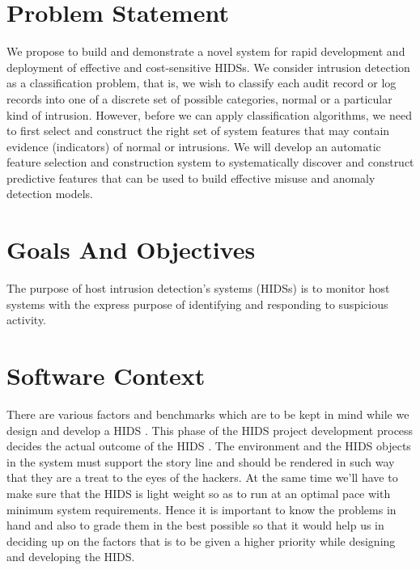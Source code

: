 \documentclass[12pt,a4paper]{report}
\begin{document}
\section{Problem Statement}
We propose to build and demonstrate a novel system for rapid development and deployment of effective and cost-sensitive HIDSs. We consider intrusion detection as a classification problem, that is, we wish to classify each audit record or log records into one of a discrete set of possible categories, normal or a particular kind of intrusion. However, before we can apply classification algorithms, we need to first select and construct the right set of system features that may contain evidence (indicators) of normal or intrusions. We will develop an automatic feature selection and construction system to systematically discover and construct predictive features that can be used to build effective misuse and anomaly detection models.
\section{Goals And Objectives}
The purpose of host intrusion detection's systems (HIDSs) is to monitor host systems with the express purpose of identifying and responding to suspicious activity.
\section{Software Context}
There are various factors and benchmarks which are to be kept in mind while we design and develop a HIDS . This phase of the HIDS project development process decides the actual outcome of the HIDS . The environment and the HIDS objects in the system must support the story line and should be rendered in such way that they are a treat to the eyes of the hackers. At the same time we'll have to make sure that the HIDS is light weight so as to run at an optimal pace with minimum system requirements. Hence it is important to know the problems in hand and also to grade them in the best possible so that it would help us in deciding up on the factors that is to be given a higher priority while designing and developing the HIDS.
\end{document}
